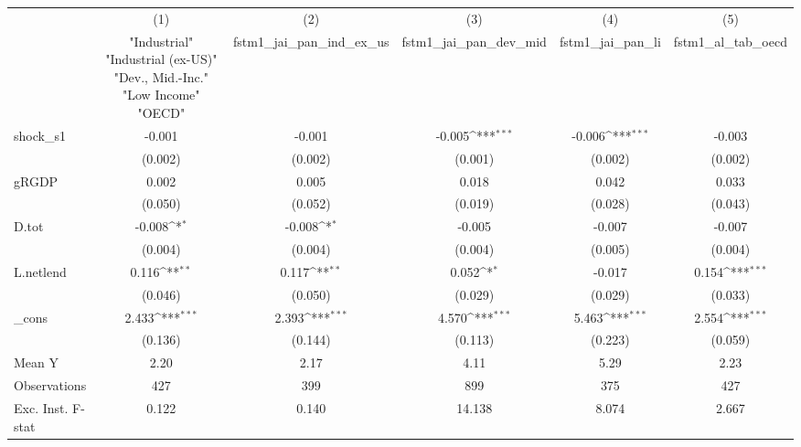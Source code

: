 {
\def\sym#1{\ifmmode^{#1}\else\(^{#1}\)\fi}
\begin{tabular}{l*{5}{c}}
\toprule
            &\multicolumn{1}{c}{(1)}&\multicolumn{1}{c}{(2)}&\multicolumn{1}{c}{(3)}&\multicolumn{1}{c}{(4)}&\multicolumn{1}{c}{(5)}\\
            &\multicolumn{1}{c}{ "Industrial" "Industrial (ex-US)" "Dev., Mid.-Inc." "Low Income" "OECD" }&\multicolumn{1}{c}{fstm1\_jai\_pan\_ind\_ex\_us}&\multicolumn{1}{c}{fstm1\_jai\_pan\_dev\_mid}&\multicolumn{1}{c}{fstm1\_jai\_pan\_li}&\multicolumn{1}{c}{fstm1\_al\_tab\_oecd}\\
\midrule
shock\_s1    &      -0.001         &      -0.001         &      -0.005\sym{***}&      -0.006\sym{***}&      -0.003         \\
            &     (0.002)         &     (0.002)         &     (0.001)         &     (0.002)         &     (0.002)         \\
\addlinespace
gRGDP       &       0.002         &       0.005         &       0.018         &       0.042         &       0.033         \\
            &     (0.050)         &     (0.052)         &     (0.019)         &     (0.028)         &     (0.043)         \\
\addlinespace
D.tot       &      -0.008\sym{*}  &      -0.008\sym{*}  &      -0.005         &      -0.007         &      -0.007         \\
            &     (0.004)         &     (0.004)         &     (0.004)         &     (0.005)         &     (0.004)         \\
\addlinespace
L.netlend   &       0.116\sym{**} &       0.117\sym{**} &       0.052\sym{*}  &      -0.017         &       0.154\sym{***}\\
            &     (0.046)         &     (0.050)         &     (0.029)         &     (0.029)         &     (0.033)         \\
\addlinespace
\_cons      &       2.433\sym{***}&       2.393\sym{***}&       4.570\sym{***}&       5.463\sym{***}&       2.554\sym{***}\\
            &     (0.136)         &     (0.144)         &     (0.113)         &     (0.223)         &     (0.059)         \\
\midrule
Mean Y      &        2.20         &        2.17         &        4.11         &        5.29         &        2.23         \\
Observations&         427         &         399         &         899         &         375         &         427         \\
Exc. Inst. F-stat&       0.122         &       0.140         &      14.138         &       8.074         &       2.667         \\
\bottomrule
\end{tabular}
}

